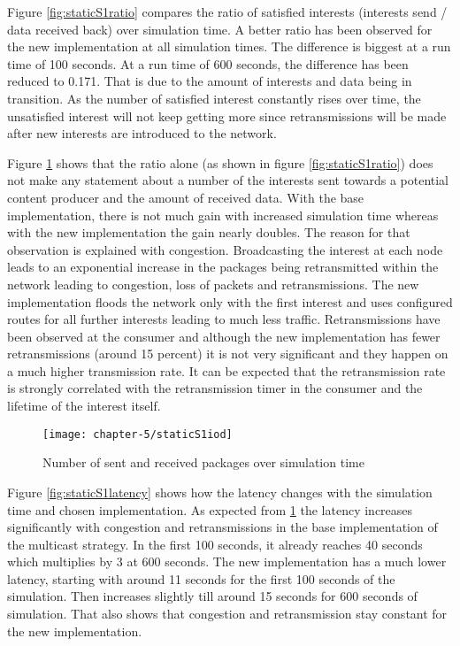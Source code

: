 \vspace{5mm} %

Figure \ref{fig:staticS1ratio} compares the ratio of satisfied interests (interests send / data received back) over simulation time. A better ratio has been observed for the new implementation at all simulation times. The difference is biggest at a run time of 100 seconds. At a run time of 600 seconds, the difference has been reduced to 0.171. That is due to the amount of interests and data being in transition. As the number of satisfied interest constantly rises over time, the unsatisfied interest will not keep getting more since retransmissions will be made after new interests are introduced to the network.

Figure \ref{fig:staticS1iod} shows that the ratio alone (as shown in figure \ref{fig:staticS1ratio}) does not make any statement about a number of the interests sent towards a potential content producer and the amount of received data. With the base implementation, there is not much gain with increased simulation time whereas with the new implementation the gain nearly doubles. The reason for that observation is explained with congestion. Broadcasting the interest at each node leads to an exponential increase in the packages being retransmitted within the network leading to congestion, loss of packets and retransmissions. The new implementation floods the network only with the first interest and uses configured routes for all further interests leading to much less traffic. Retransmissions have been observed at the consumer and although the new implementation has fewer retransmissions (around 15 percent) it is not very significant and they happen on a much higher transmission rate. It can be expected that the retransmission rate is strongly correlated with the retransmission timer in the consumer and the lifetime of the interest itself.

\begin{figure}[H]
  \centering
  \texttt{[image: chapter-5/staticS1iod]}
  \caption{Number of sent and received packages over simulation time}
  \label{fig:staticS1iod}
\end{figure}

Figure \ref{fig:staticS1latency} shows how the latency changes with the simulation time and chosen implementation. As expected from \ref{fig:staticS1iod} the latency increases significantly with congestion and retransmissions in the base implementation of the multicast strategy. In the first 100 seconds, it already reaches 40 seconds which multiplies by 3 at 600 seconds. The new implementation has a much lower latency, starting with around 11 seconds for the first 100 seconds of the simulation. Then increases slightly till around 15 seconds for 600 seconds of simulation. That also shows that congestion and retransmission stay constant for the new implementation.

